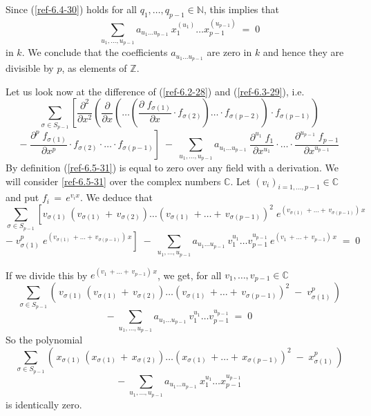 \documentclass{amsart}
\numberwithin{equation}{section}
\let\blb\mathbb
\def\CC{{\blb C}}
\def \ZZ{{\blb Z}}
\def \NN{{\blb N}}
\theoremstyle{definition}
\theoremstyle{remark}
\begin{document}
Since (\ref{ref-6.4-30}) holds for all $q_{1}, \ldots ,q_{p-1} \in \NN$, 
this implies that 
\[\sum_{u_{1}, \ldots ,u_{p-1}} a_{u_{1} \ldots u_{p-1}} \: 
x_{1}^{(u_{1})} \dots x_{p-1}^{(u_{p-1})} \;=\; 0 \]
in $k$.
We conclude that the coefficients $a_{u_{1} \ldots u_{p-1}}$ are 
zero in $k$ and hence they are divisible by $p$, as elements of $\ZZ$.
 
 Let us look now at the difference of (\ref{ref-6.2-28}) and (\ref{ref-6.3-29}), i.e.
\begin{equation} \label{ref-6.5-31}
    \sum_{\sigma \in S_{p-1}} \left[ 
    \frac{\partial^{2}}{\partial x^{2}} \left( 
    \frac{\partial}{\partial x} \left( \ldots \left( 
    \frac{\partial \; f_{\sigma(1)}}{\partial x} \cdot f_{\sigma(2)} 
    \right) \ldots \cdot f_{\sigma(p-2)} \right) \cdot 
    f_{\sigma(p-1)} \right) \right. 
\end{equation}
\[ \left. -\; \frac{\partial^{p} \; f_{\sigma(1)}}{\partial x^{p}} 
    \cdot f_{\sigma(2)} \cdot \ldots \cdot f_{\sigma(p-1)} \right] 
    \;-\; \sum_{u_{1}, \ldots ,u_{p-1}} 
    a_{u_{1} \ldots u_{p-1}} \: 
    \frac{\partial^{u_{1}} \; f_{1}}{\partial x^{u_{1}}} 
    \cdot \ldots \cdot 
    \frac{\partial^{u_{p-1}} \; f_{p-1}}{\partial x^{u_{p-1}}} \]
By definition (\ref{ref-6.5-31}) is equal to zero over any field with a 
derivation.  We will consider \eqref{ref-6.5-31} over the complex numbers $\CC$.
Let $(v_i)_{i=1,\ldots,p-1}\in \CC$ and put $f_{i}\,=\,e^{v_{i}x}$.
We deduce that 
\[ \sum_{\sigma \in S_{p-1}} \left[ v_{\sigma(1)} \, 
(v_{\sigma(1)}\,+\,v_{\sigma(2)}) \ldots (v_{\sigma(1)}\,+ \ldots +\, 
v_{\sigma(p-1)})^{2} \; 
e^{(v_{\sigma(1)} \,+ \ldots +\, v_{\sigma(p-1)})\,x} \right. \]
\[ \left. -\; v_{\sigma(1)}^{p} \; 
e^{(v_{\sigma(1)} \,+ \ldots +\, v_{\sigma(p-1)})\,x} \right] \;-\; 
\sum_{u_{1}, \ldots ,u_{p-1}} a_{u_{1} \ldots u_{p-1}} \: 
v_{1}^{u_{1}} \ldots v_{p-1}^{u_{p-1}} \: e^{(v_{1} \,+ \ldots +\, 
v_{p-1})\,x} \;=\;0 \]

If we divide this by $e^{(v_{1} \,+ \ldots +\,v_{p-1})\,x}$, we get, 
for all $v_{1}, \ldots ,v_{p-1} \in \CC$
\[ \sum_{\sigma \in S_{p-1}} (\, v_{\sigma(1)} \, 
(v_{\sigma(1)} \,+\, v_{\sigma(2)}) \ldots 
(v_{\sigma(1)} \,+ \ldots +\, v_{\sigma(p-1)})^{2} 
\;-\; v_{\sigma(1)}^{p} \,) \]
\[ -\; \sum_{u_{1}, \ldots ,u_{p-1}} a_{u_{1} \ldots u_{p-1}} \: 
v_{1}^{u_{1}} \ldots v_{p-1}^{u_{p-1}} \;=\; 0 \]
So the polynomial
\[ \sum_{\sigma \in S_{p-1}} (\, x_{\sigma(1)} \, 
(x_{\sigma(1)} \,+\, x_{\sigma(2)}) \ldots 
(x_{\sigma(1)} \,+ \ldots +\, x_{\sigma(p-1)})^{2} 
\;-\; x_{\sigma(1)}^{p} \,) \]
\[ -\; \sum_{u_{1}, \ldots ,u_{p-1}} a_{u_{1} \ldots u_{p-1}} \: 
x_{1}^{u_{1}} \ldots x_{p-1}^{u_{p-1}} \]
is identically zero.
\end{document}
